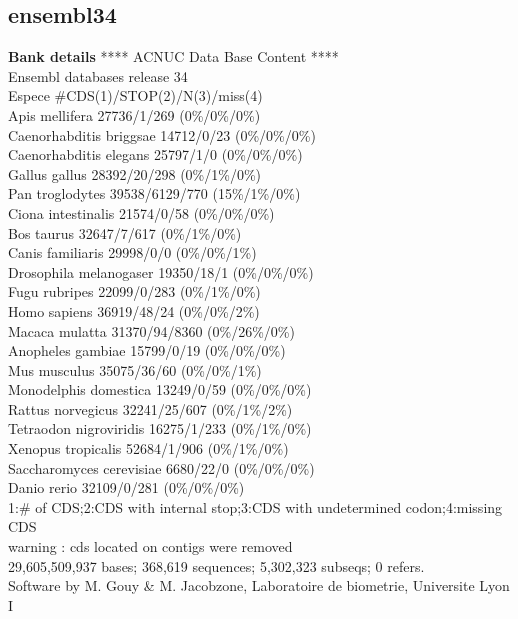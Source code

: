 \documentclass{article}
\begin{document}
\begin{Schunk}
\section{ ensembl34 }
\textbf{Bank details}
            ****     ACNUC Data Base Content      ****   \\
                 Ensembl databases release 34        \\
Espece                                   \#CDS(1)/STOP(2)/N(3)/miss(4)\\
Apis mellifera                          27736/1/269 (0\%/0\%/0\%)\\
Caenorhabditis briggsae                 14712/0/23 (0\%/0\%/0\%)\\
Caenorhabditis elegans                  25797/1/0 (0\%/0\%/0\%)\\
Gallus gallus                           28392/20/298 (0\%/1\%/0\%)\\
Pan troglodytes                         39538/6129/770 (15\%/1\%/0\%)\\
Ciona intestinalis                      21574/0/58 (0\%/0\%/0\%)\\
Bos taurus                              32647/7/617 (0\%/1\%/0\%)\\
Canis familiaris                        29998/0/0 (0\%/0\%/1\%)\\
Drosophila melanogaser                  19350/18/1 (0\%/0\%/0\%)\\
Fugu rubripes                           22099/0/283 (0\%/1\%/0\%)\\
Homo sapiens                            36919/48/24 (0\%/0\%/2\%)\\
Macaca mulatta                          31370/94/8360 (0\%/26\%/0\%)\\
Anopheles gambiae                       15799/0/19 (0\%/0\%/0\%)\\
Mus musculus                            35075/36/60 (0\%/0\%/1\%)\\
Monodelphis domestica                   13249/0/59 (0\%/0\%/0\%)\\
Rattus norvegicus                       32241/25/607 (0\%/1\%/2\%)\\
Tetraodon nigroviridis                  16275/1/233 (0\%/1\%/0\%)\\
Xenopus tropicalis                      52684/1/906 (0\%/1\%/0\%)\\
Saccharomyces cerevisiae                6680/22/0 (0\%/0\%/0\%)\\
Danio rerio                             32109/0/281 (0\%/0\%/0\%)\\
1:\# of CDS;2:CDS with internal stop;3:CDS with undetermined codon;4:missing CDS\\
   warning : cds located on contigs were removed\\
29,605,509,937 bases; 368,619 sequences; 5,302,323 subseqs; 0 refers.\\
Software by M. Gouy \& M. Jacobzone, Laboratoire de biometrie, Universite Lyon I 


\end{Schunk}
\end{document}
